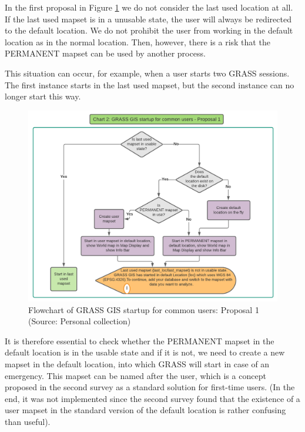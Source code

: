 \documentclass[a4paper,10pt,twoside]{article}
\begin{document}
In the first proposal in Figure \ref{fig:normal_user_diagram} we do
not consider the last used location at all. If the last used mapset is
in a unusable state, the user will always be redirected to the
default location. We do not prohibit the user from working in the
default location as in the normal location. Then, however, there is a
risk that the PERMANENT mapset can be used by another process. 

\newpage
\noindent This situation can occur, for example, when a user starts two GRASS
sessions. The first instance starts in the last used mapset, but the
second instance can no longer start this way.

\vspace{0.3cm}
\begin{figure}[hbt!] 
\begin{center}
\includegraphics[width=16.5cm]{../pictures/normal_user_diagram.png} 
\caption[Flowchart of GRASS GIS startup for common users: Proposal 1]{Flowchart of GRASS GIS startup for common users: Proposal 1 (Source: Personal collection)}
\label{fig:normal_user_diagram}
\end{center}
\end{figure}

\noindent It is therefore essential to check whether the PERMANENT
mapset in the default location is in the usable state and if it is
not, we need to create a new mapset in the default location, into
which GRASS will start in case of an emergency. This mapset can be named
after the user, which is a concept proposed in the second survey as a
standard solution for first-time users. (In the end, it was not
implemented since the second survey found that the existence of a user
mapset in the standard version of the default location is rather
confusing than useful).
\end{document}
